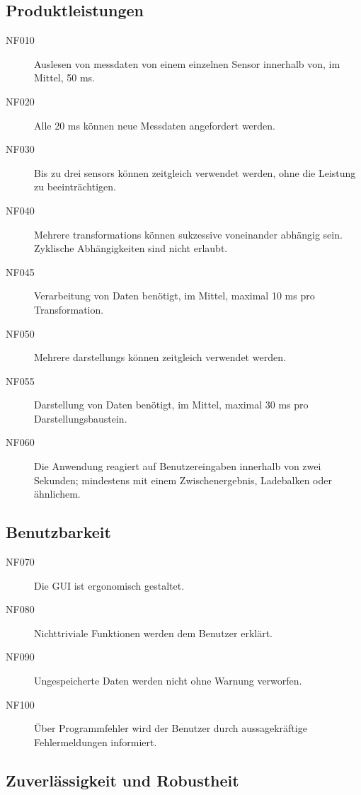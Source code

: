 \documentclass[parskip=full]{scrartcl}
\begin{document}
\subsection{Produktleistungen}

\begin{description}

\item[NF010] Auslesen von \gls{messdaten} von einem einzelnen Sensor innerhalb von, im Mittel, 50 ms.
\item[NF020] Alle 20 ms können neue Messdaten angefordert werden.
\item[NF030] Bis zu drei \glspl{sensor} können zeitgleich verwendet werden, ohne die Leistung zu beeinträchtigen.
\item[NF040] Mehrere \glspl{transformation} können sukzessive voneinander abhängig sein. Zyklische Abhängigkeiten sind nicht erlaubt.
\item[NF045] Verarbeitung von Daten benötigt, im Mittel, maximal 10 ms pro Transformation.
\item[NF050] Mehrere \glspl{darstellung} können zeitgleich verwendet werden.
\item[NF055] Darstellung von Daten benötigt, im Mittel, maximal 30 ms pro Darstellungsbaustein.
\item[NF060] Die Anwendung reagiert auf Benutzereingaben innerhalb von zwei Sekunden; mindestens mit einem Zwischenergebnis, Ladebalken oder ähnlichem.

\end{description}

\subsection{Benutzbarkeit}

\begin{description}

\item[NF070] Die \gls{GUI} ist ergonomisch gestaltet.
\item[NF080] Nichttriviale Funktionen werden dem Benutzer erklärt.
\item[NF090] Ungespeicherte Daten werden nicht ohne Warnung verworfen.
\item[NF100] Über Programmfehler wird der Benutzer durch aussagekräftige Fehlermeldungen informiert.

\end{description}

\subsection{Zuverlässigkeit und Robustheit}
\end{document}
